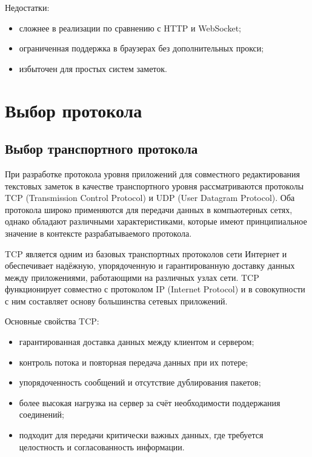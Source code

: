 Недостатки:

\begin{itemize}
    \item сложнее в реализации по сравнению с HTTP и WebSocket;
    \item ограниченная поддержка в браузерах без дополнительных прокси;
    \item избыточен для простых систем заметок.
\end{itemize}

\section{Выбор протокола}

\subsection*{Выбор транспортного протокола}

При разработке протокола уровня приложений для совместного редактирования текстовых заметок в качестве транспортного уровня рассматриваются протоколы TCP (Transmission Control Protocol) и UDP (User Datagram Protocol). Оба протокола широко применяются для передачи данных в компьютерных сетях, однако обладают различными характеристиками, которые имеют принципиальное значение в контексте разрабатываемого протокола.

TCP является одним из базовых транспортных протоколов сети Интернет и обеспечивает надёжную, упорядоченную и гарантированную доставку данных между приложениями, работающими на различных узлах сети. TCP функционирует совместно с протоколом IP (Internet Protocol) и в совокупности с ним составляет основу большинства сетевых приложений.

Основные свойства TCP:

\begin{itemize}
    \item гарантированная доставка данных между клиентом и сервером;
    \item контроль потока и повторная передача данных при их потере;
    \item упорядоченность сообщений и отсутствие дублирования пакетов;
    \item более высокая нагрузка на сервер за счёт необходимости поддержания соединений;
    \item подходит для передачи критически важных данных, где требуется целостность и согласованность информации.
\end{itemize}

